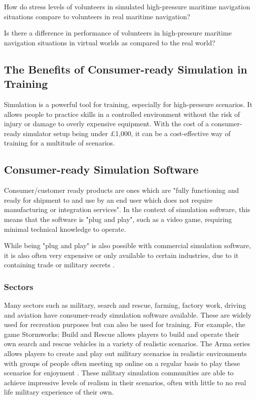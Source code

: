 \documentclass[12pt]{article}
\begin{document}
How do stress levels of volunteers in simulated high-pressure maritime navigation situations compare to volunteers in real maritime navigation?

Is there a difference in performance of volunteers in high-pressure maritime navigation situations in virtual worlds as compared to the real world?

\subsection{The Benefits of Consumer-ready Simulation in Training}

Simulation is a powerful tool for training, especially for high-pressure scenarios. It allows people to practice skills in a controlled environment without the risk of injury or damage to overly expensive equipment. With the cost of a consumer-ready simulator setup being under £1,000, it can be a cost-effective way of training for a multitude of scenarios.


\subsection{Consumer-ready Simulation Software}

Consumer/customer ready products are ones which are "fully functioning and ready for shipment to and use by an end user which does not require manufacturing or integration services". \cite{LawInsiderCustomerReady} In the context of simulation software, this means that the software is "plug and play", such as a video game, requiring minimal technical knowledge to operate. 

While being "plug and play" is also possible with commercial simulation software, it is also often very expensive \cite{ESIGamesStore}\cite{BISimVBS4Update} or only available to certain industries, due to it containing trade or military secrets \cite{BISimShipWalkthrough}. 


\subsubsection{Sectors}

Many sectors such as military, search and rescue, farming, factory work, driving and aviation have consumer-ready simulation software available. These are widely used for recreation purposes but can also be used for training. For example, the game Stormworks: Build and Rescue \cite{stormworks} allows players to build and operate their own search and rescue vehicles in a variety of realistic scenarios. The Arma series allows players to create and play out military scenarios in realistic environments \cite{arma3} with groups of people often meeting up online on a regular basis to play these scenarios for enjoyment \cite{42CommandoArma3} \cite{BourboneFreeman}. These military simulation communities are able to achieve impressive levels of realism in their scenarios, often with little to no real life military experience of their own. 
\end{document}
